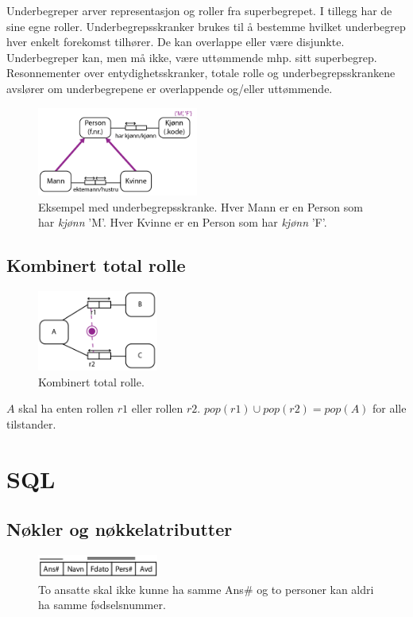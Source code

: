 \documentclass[11pt,a4paper]{article}
\begin{document}
Underbegreper arver representasjon og roller fra superbegrepet. I tillegg har de sine egne roller. Underbegrepsskranker brukes til å bestemme hvilket underbegrep hver enkelt forekomst tilhører. De kan overlappe eller være disjunkte. Underbegreper kan, men må ikke, være uttømmende mhp. sitt superbegrep. Resonnementer over entydighetsskranker, totale rolle og underbegrepsskrankene avslører om underbegrepene er overlappende og/eller uttømmende.

\begin{figure}[h!]
	\centering
		\includegraphics[width=200px]{img/undeks-01.png}
	\caption{Eksempel med underbegrepsskranke. Hver Mann er en Person som har \textit{kjønn} 'M'. Hver Kvinne er en Person som har \textit{kjønn} 'F'.}
\end{figure}

\subsection{Kombinert total rolle}
\begin{figure}[h!]
	\centering
		\includegraphics[width=150px]{img/ktot-01.png}
	\caption{Kombinert total rolle.}
\end{figure}

$A$ skal ha enten rollen $r1$ eller rollen $r2$. $pop(r1) \cup pop(r2) = pop(A)$ for alle tilstander.

\section{SQL}

\subsection{Nøkler og nøkkelatributter}
\begin{figure}[h!]
	\centering
		\includegraphics[width=150px]{img/nok-01.png}
	\caption{To ansatte skal ikke kunne ha samme Ans\# og to personer kan aldri ha samme fødselsnummer.}
\end{figure}
\end{document}
